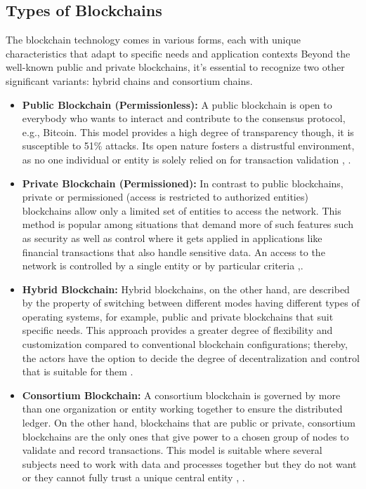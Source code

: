 \subsection{Types of Blockchains}

The blockchain technology comes in various forms, each with unique characteristics that adapt to specific needs and application contexts Beyond the well-known public and 
private blockchains, it's essential to recognize two other significant variants: hybrid chains and consortium chains.

\begin{itemize}
  \item \textbf{Public Blockchain (Permissionless):} A public blockchain is open to everybody who wants to interact and contribute to the consensus protocol, e.g., Bitcoin. 
  This model provides a high degree of transparency though, it is susceptible to 51\% attacks. Its open nature fosters a distrustful environment, as no one individual or 
  entity is solely relied on for transaction validation \cite{9596538}, \cite{ibm_blockchain}.
  \item \textbf{Private Blockchain (Permissioned):} In contrast to public blockchains, private or permissioned (access is restricted to authorized entities) blockchains 
  allow only a limited set of entities to access the network. This method is popular among situations that demand more of such features such as security as well as control 
  where it gets applied in applications like financial transactions that also handle sensitive data. An access to the network is controlled by a single entity or by 
  particular criteria \cite{9596538},\cite{9036241}.
  \item \textbf{Hybrid Blockchain:} Hybrid blockchains, on the other hand, are described by the property of switching between different modes having different types of 
  operating systems, for example, public and private blockchains that suit specific needs. This approach provides a greater degree of flexibility and customization compared 
  to conventional blockchain configurations; thereby, the actors have the option to decide the degree of decentralization and control that is suitable for them \cite{9596538}.
  \item \textbf{Consortium Blockchain:} A consortium blockchain is governed by more than one organization or entity working together to ensure the distributed ledger. 
  On the other hand, blockchains that are public or private, consortium blockchains are the only ones that give power to a chosen group of nodes to validate and record 
  transactions. This model is suitable where several subjects need to work with data and processes together but they do not want or they cannot fully trust a unique 
  central entity \cite{ibm_blockchain}, \cite{9752154}.
\end{itemize}


